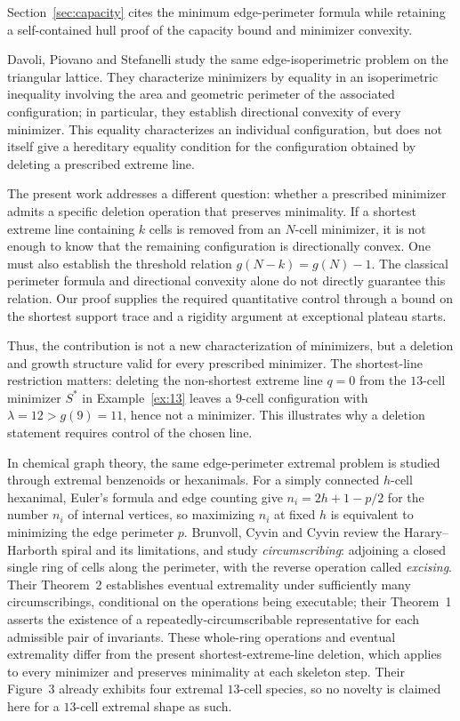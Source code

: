 \documentclass[11pt]{article}
\theoremstyle{plain}
\theoremstyle{definition}
\theoremstyle{remark}
\begin{document}
Section~\ref{sec:capacity} cites the minimum edge-perimeter formula while retaining a
self-contained hull proof of the capacity bound and minimizer convexity.

Davoli, Piovano and Stefanelli \cite[Theorem~1.1]{DavoliPiovanoStefanelli2017}
study the same edge-isoperimetric problem on the triangular lattice. They characterize
minimizers by equality in an isoperimetric inequality involving the area and
geometric perimeter of the associated configuration; in particular, they establish
directional convexity of every minimizer. This equality characterizes an individual
configuration, but does not itself give a hereditary equality condition for the
configuration obtained by deleting a prescribed extreme line.

The present work addresses a different question: whether a prescribed minimizer
admits a specific deletion operation that preserves minimality. If a shortest
extreme line containing \(k\) cells is removed from an \(N\)-cell minimizer, it is
not enough to know that the remaining configuration is directionally convex.
One must also establish the threshold relation \(g(N-k)=g(N)-1\). The classical
perimeter formula and directional convexity alone do not directly guarantee
this relation. Our proof supplies the required quantitative control through
a bound on the shortest support trace and a rigidity argument at exceptional
plateau starts.

Thus, the contribution is not a new characterization of minimizers, but a
deletion and growth structure valid for every prescribed minimizer.
The shortest-line restriction matters: deleting the non-shortest extreme line
\(q=0\) from the \(13\)-cell minimizer \(S^{\ast}\) in Example~\ref{ex:13}
leaves a \(9\)-cell configuration with \(\lambda=12>g(9)=11\), hence not a minimizer.
This illustrates why a deletion statement requires control of the chosen line.

In chemical graph theory, the same edge-perimeter extremal problem is
studied through extremal benzenoids or hexanimals. For a simply
connected \(h\)-cell hexanimal, Euler's formula and edge counting give
\(n_i=2h+1-p/2\) for the number \(n_i\) of internal vertices, so maximizing
\(n_i\) at fixed \(h\) is equivalent to minimizing the edge perimeter \(p\).
Brunvoll, Cyvin and Cyvin \cite{BrunvollCyvinCyvin1993} review the
Harary--Harborth spiral and its limitations, and study
\emph{circumscribing}: adjoining a closed single ring of cells along
the perimeter, with the reverse operation called \emph{excising}.
Their Theorem~2 establishes eventual extremality under sufficiently
many circumscribings, conditional on the operations being executable;
their Theorem~1 asserts the existence of a repeatedly-circumscribable
representative for each admissible pair of invariants.
These whole-ring operations and eventual extremality differ from the
present shortest-extreme-line deletion, which applies to every
minimizer and preserves minimality at each skeleton step. Their
Figure~3 already exhibits four extremal \(13\)-cell species, so no
novelty is claimed here for a \(13\)-cell extremal shape as such.
\end{document}
